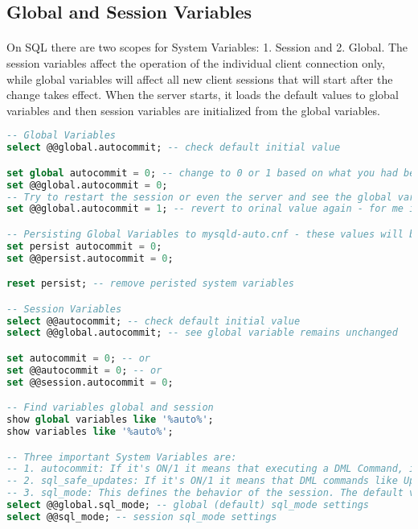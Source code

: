 \subsection{Global and Session Variables}
\paragraph{} On SQL there are two scopes for System Variables: 1. Session and 2. Global. The session variables affect the operation of the individual client connection only, while global variables will affect all new client sessions that will start after the change takes effect. When the server starts, it loads the default values to global variables and then session variables are initialized from the global variables.
\begin{lstlisting}[language=SQL]
-- Global Variables
select @@global.autocommit; -- check default initial value

set global autocommit = 0; -- change to 0 or 1 based on what you had before and see it changed to the new value
set @@global.autocommit = 0;
-- Try to restart the session or even the server and see the global variable is the same
set @@global.autocommit = 1; -- revert to orinal value again - for me it was 151

-- Persisting Global Variables to mysqld-auto.cnf - these values will be loaded to global variables upon server restart
set persist autocommit = 0;
set @@persist.autocommit = 0;

reset persist; -- remove peristed system variables

-- Session Variables
select @@autocommit; -- check default initial value
select @@global.autocommit; -- see global variable remains unchanged

set autocommit = 0; -- or
set @@autocommit = 0; -- or
set @@session.autocommit = 0;

-- Find variables global and session
show global variables like '%auto%';
show variables like '%auto%';

-- Three important System Variables are:
-- 1. autocommit: If it's ON/1 it means that executing a DML Command, it will be autocommitted - no option to rollback
-- 2. sql_safe_updates: If it's ON/1 it means that DML commands like Update & Delete are allowed to be executed only when a primary key is included in the where clause
-- 3. sql_mode: This defines the behavior of the session. The default values are there for a reason and you should not mess with these unless you really know what you are doing
select @@global.sql_mode; -- global (default) sql_mode settings
select @@sql_mode; -- session sql_mode settings
\end{lstlisting}
